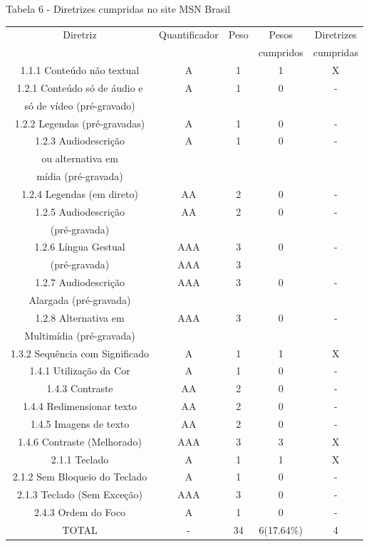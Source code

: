\documentclass[a4paper]{article}
\begin{document}
\begin{titlepage}
Tabela 6 - Diretrizes cumpridas no site MSN Brasil\\[-1cm]
\begin{center}
	\fontsize{8pt}{8pt}\selectfont	
	\begin{longtable}{|c|c|c|c|c|}
		\hline
		Diretriz & Quantificador & Peso & Pesos & Diretrizes\\
		& & & cumpridos & cumpridas\\
		\hline
		1.1.1 Conteúdo não textual & A & 1 & 1 & X \\
		\hline
		1.2.1 Conteúdo só de áudio e & A & 1 & 0 & - \\
		só de vídeo (pré-gravado) & & & & \\
		\hline
		1.2.2 Legendas (pré-gravadas) & A & 1 & 0 & - \\
		\hline
		1.2.3 Audiodescrição & A & 1 & 0 & - \\
		ou alternativa em & & & & \\
		mídia (pré-gravada) & & & & \\
		\hline
		1.2.4 Legendas (em direto) & AA & 2 & 0 & - \\
		\hline
		1.2.5 Audiodescrição & AA & 2 & 0 & - \\
		(pré-gravada) & & & & \\
		\hline
		1.2.6 Língua Gestual & AAA & 3 & 0 & - \\
		(pré-gravada) & AAA & 3 & & \\
		\hline
		1.2.7 Audiodescrição & AAA & 3 & 0 & - \\
		Alargada (pré-gravada) & & & & \\
		\hline
		1.2.8 Alternativa em & AAA & 3 & 0 & - \\
		Multimídia (pré-gravada) & & & & \\
		\hline
		1.3.2 Sequência com Significado & A & 1 & 1 & X \\
		\hline
		1.4.1 Utilização da Cor & A & 1 & 0 & - \\
		\hline
		1.4.3 Contraste & AA & 2 & 0 & - \\
		\hline
		1.4.4 Redimensionar texto & AA & 2 & 0 & - \\
		\hline
		1.4.5 Imagens de texto & AA & 2 & 0 & - \\
		\hline
		1.4.6 Contraste (Melhorado) & AAA & 3 & 3 & X \\
		\hline
		2.1.1 Teclado & A & 1 & 1 & X \\
		\hline
		2.1.2 Sem Bloqueio do Teclado & A & 1 & 0 & - \\
		\hline
		2.1.3 Teclado (Sem Exceção) & AAA & 3 & 0 & - \\
		\hline
		2.4.3 Ordem do Foco & A & 1 & 0 & - \\
		\hline
		TOTAL & - & 34 & 6(17.64\%) & 4 \\
		\hline
	\end{longtable}
\end{center}


\end{titlepage}
\end{document}

